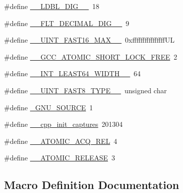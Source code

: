 \begin{DoxyCompactItemize}
\item 
\#define \hyperlink{cmake-build-debug_2babel__client__autogen_2moc__predefs_8h_a3aa761811887b1634bfca566fa671424}{\+\_\+\+\_\+\+L\+D\+B\+L\+\_\+\+D\+I\+G\+\_\+\+\_\+}~18
\item 
\#define \hyperlink{cmake-build-debug_2babel__client__autogen_2moc__predefs_8h_ad666d9aaf02b587abdeffff5ce3545e2}{\+\_\+\+\_\+\+F\+L\+T\+\_\+\+D\+E\+C\+I\+M\+A\+L\+\_\+\+D\+I\+G\+\_\+\+\_\+}~9
\item 
\#define \hyperlink{cmake-build-debug_2babel__client__autogen_2moc__predefs_8h_a5db559b8fe7a2135f05686e92ce64d9d}{\+\_\+\+\_\+\+U\+I\+N\+T\+\_\+\+F\+A\+S\+T16\+\_\+\+M\+A\+X\+\_\+\+\_\+}~0xffffffffffffffff\+UL
\item 
\#define \hyperlink{cmake-build-debug_2babel__client__autogen_2moc__predefs_8h_a889943b266851fe7e9cdac86795507aa}{\+\_\+\+\_\+\+G\+C\+C\+\_\+\+A\+T\+O\+M\+I\+C\+\_\+\+S\+H\+O\+R\+T\+\_\+\+L\+O\+C\+K\+\_\+\+F\+R\+EE}~2
\item 
\#define \hyperlink{cmake-build-debug_2babel__client__autogen_2moc__predefs_8h_a83a4ddd79aaf0dd95eaa234e59cec667}{\+\_\+\+\_\+\+I\+N\+T\+\_\+\+L\+E\+A\+S\+T64\+\_\+\+W\+I\+D\+T\+H\+\_\+\+\_\+}~64
\item 
\#define \hyperlink{cmake-build-debug_2babel__client__autogen_2moc__predefs_8h_a8cf0f2397b96d2a198ff932dbfa50344}{\+\_\+\+\_\+\+U\+I\+N\+T\+\_\+\+F\+A\+S\+T8\+\_\+\+T\+Y\+P\+E\+\_\+\+\_\+}~unsigned char
\item 
\#define \hyperlink{cmake-build-debug_2babel__client__autogen_2moc__predefs_8h_a369266c24eacffb87046522897a570d5}{\+\_\+\+G\+N\+U\+\_\+\+S\+O\+U\+R\+CE}~1
\item 
\#define \hyperlink{cmake-build-debug_2babel__client__autogen_2moc__predefs_8h_a5162baf69b085321c18fe6f0bdb537e9}{\+\_\+\+\_\+cpp\+\_\+init\+\_\+captures}~201304
\item 
\#define \hyperlink{cmake-build-debug_2babel__client__autogen_2moc__predefs_8h_acdfdd67de0664b690c42bba327cf7da1}{\+\_\+\+\_\+\+A\+T\+O\+M\+I\+C\+\_\+\+A\+C\+Q\+\_\+\+R\+EL}~4
\item 
\#define \hyperlink{cmake-build-debug_2babel__client__autogen_2moc__predefs_8h_a5822cf04414d99e0ee81e8bbe182226b}{\+\_\+\+\_\+\+A\+T\+O\+M\+I\+C\+\_\+\+R\+E\+L\+E\+A\+SE}~3
\end{DoxyCompactItemize}


\subsection{Macro Definition Documentation}
\mbox{\label{cmake-build-debug_2babel__client__autogen_2moc__predefs_8h_ac78e83c300ae463c501bbe70c5a2a8c7}} 
